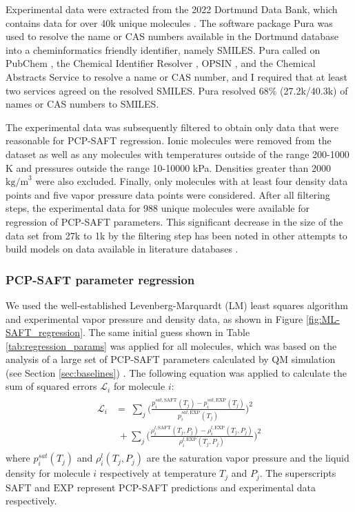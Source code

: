 Experimental data were extracted from the 2022 Dortmund Data Bank, which contains data for over 40k unique molecules \cite{dortmunddatabank}. The software package Pura \cite{purapython} was used to resolve the name or CAS numbers available in the Dortmund database into a cheminformatics friendly identifier, namely SMILES. Pura called on PubChem \cite{Kim2020}, the Chemical Identifier Resolver \cite{cir}, OPSIN \cite{Lowe2011}, and the Chemical Abstracts Service \cite{commonchem} to resolve a name or CAS number, and I required that at least two services agreed on the resolved SMILES. Pura resolved 68\% (27.2k/40.3k) of names or CAS numbers to SMILES. 

The experimental data was subsequently filtered to obtain only data that were reasonable for PCP-SAFT regression. Ionic molecules were removed from the dataset as well as any molecules with temperatures outside of the range 200-1000 K and pressures outside the range 10-10000 kPa. Densities greater than 2000 $\text{kg/m}^{3}$ were also excluded. Finally, only molecules with at least four density data points and five vapor pressure data points were considered. After all filtering steps, the experimental data for 988 unique molecules were available for regression of PCP-SAFT parameters. This significant decrease in the size of the data set from 27k to 1k by the filtering step has been noted in other attempts to build models on data available in literature databases \cite{Fitzner2020, Gao2018}. 

\subsubsection{PCP-SAFT parameter regression}

We used the well-established Levenberg-Marquardt (LM) least squares algorithm and experimental vapor pressure and density data, as shown in Figure \ref{fig:ML-SAFT_regression}. The same initial guess shown in Table \ref{tab:regression_params} was applied for all molecules, which was based on the analysis of a large set of PCP-SAFT parameters calculated by QM simulation (see Section \ref{sec:baselines}) \cite{Kaminski2020}. The following equation was applied to calculate the sum of squared errors $\mathcal{L}_i$ for molecule $i$:
\begin{gather}
\begin{aligned}
    \mathcal{L}_i & = \; \sum_j \biggl(\frac{p_{i}^{sat,\text{SAFT}}(T_j) - p_{i}^{sat,\text{EXP}}(T_j)}{ p_{i}^{sat,\text{EXP}}(T_j)}\biggr)^2 \\
    & \; + \sum_j \biggl(\frac{\rho_{i}^{l,\text{SAFT}}(T_j, P_j) - \rho_{i}^{l,\text{EXP}}(T_j, P_j) }{\rho_{i}^{l,\text{EXP}}(T_j, P_j) }\biggr)^2 
\end{aligned}
\end{gather}
where $p_i^{sat}(T_j)$ and $\rho_{i}^{l}(T_j, P_j)$ are the saturation vapor pressure and the liquid density for molecule $i$ respectively at temperature $T_j$ and $P_j$. The superscripts $\text{SAFT}$ and $\text{EXP}$ represent PCP-SAFT predictions and experimental data respectively. 

